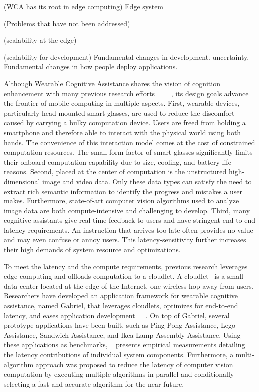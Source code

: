 (WCA has its root in edge computing)
Edge system

(Problems that have not been addressed)

(scalability at the edge)

(scalability for development)
Fundamental changes in development. uncertainty. Fundamental changes in how
people deploy applications.

Although Wearable Cognitive Assistance shares the vision of cognition
enhancement with many previous research
efforts~\cite{kidd1999aware}~\cite{loomis1998navigation}
~\cite{cheverst2000developing}~\cite{tanuwidjaja2014chroma},
its design goals advance the frontier of mobile computing in multiple aspects.
First, wearable devices, particularly head-mounted smart glasses, are used to
reduce the discomfort caused by carrying a bulky computation device. Users are
freed from holding a smartphone and therefore able to interact with the physical
world using both hands. The convenience of this interaction model comes at the
cost of constrained computation resources. The small form-factor of smart
glasses significantly limits their onboard computation capability due to size,
cooling, and battery life reasons. Second, placed at the center of computation
is the unstructured high-dimensional image and video data. Only these data types
can satisfy the need to extract rich semantic information to identify the
progress and mistakes a user makes. Furthermore, state-of-art computer vision
algorithms used to analyze image data are both compute-intensive and challenging
to develop. Third, many cognitive assistants give real-time feedback to users
and have stringent end-to-end latency requirements. An instruction that arrives
too late often provides no value and may even confuse or annoy users. This
latency-sensitivity further increases their high demands of system resource and
optimizations.

To meet the latency and the compute requirements, previous research leverages
edge computing and offloads computation to a cloudlet. A
cloudlet~\cite{satyanarayanan2009case} is a small data-center located at the
edge of the Internet, one wireless hop away from users. Researchers have
developed an application framework for wearable cognitive assistance, named
Gabriel, that leverages cloudlets, optimizes for end-to-end latency, and eases
application
development~\cite{chen2018application}~\cite{ha2014towards}~\cite{chen2017empirical}.
On top of Gabriel, several prototype applications have been built, such as
Ping-Pong Assistance, Lego Assistance, Sandwich Assistance, and Ikea Lamp
Assembly Assistance. Using these applications as benchmarks,
~\cite{chen2017empirical} presents empirical measurements detailing the latency
contributions of individual system components. Furthermore, a multi-algorithm
approach was proposed to reduce the latency of computer vision computation by
executing multiple algorithms in parallel and conditionally selecting a fast and
accurate algorithm for the near future.

